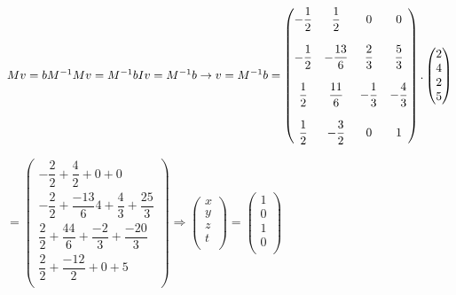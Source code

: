 \documentclass[fleqn]{article}
\begin{document}
\begin{enumerate}
      \textcolor{hwColor}{
        $
          Mv=b \\
          M^{-1}Mv=M^{-1}b \\
          Iv=M^{-1}b \\
          \rightarrow v=M^{-1}b\\
          =\begin{pmatrix}
            -\dfrac{1}{2} & \dfrac{1}{2} & 0 & 0 \\
            \\
            -\dfrac{1}{2} & -\dfrac{13}{6} & \dfrac{2}{3} & \dfrac{5}{3} \\
            \\
            \dfrac{1}{2} & \dfrac{11}{6} & -\dfrac{1}{3} & -\dfrac{4}{3} \\
            \\ 
            \dfrac{1}{2} & -\dfrac{3}{2} & 0 & 1 \\ 
          \end{pmatrix}.\begin{pmatrix}
            2 \\
            4 \\
            2 \\
            5 \\
          \end{pmatrix}
        $
      }

      \textcolor{hwColor}{
        $
          =\begin{pmatrix}
            -\dfrac{2}{2}+\dfrac{4}{2}+0+0 \\
            -\dfrac{2}{2}+\dfrac{-13}{6}4+\dfrac{4}{3}+\dfrac{25}{3} \\
            \dfrac{2}{2}+\dfrac{44}{6}+\dfrac{-2}{3}+\dfrac{-20}{3} \\
            \dfrac{2}{2}+\dfrac{-12}{2}+0+5 \\
          \end{pmatrix}
          \Longrightarrow \begin{pmatrix}
            x \\
            y \\
            z \\
            t \\
          \end{pmatrix}=\begin{pmatrix}
            1 \\
            0 \\
            1 \\
            0 \\
          \end{pmatrix}
        $
      }


\end{enumerate}
\end{document}
